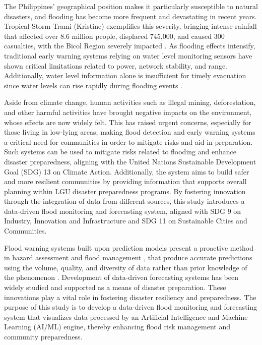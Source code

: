 \documentclass{research}
\begin{document}
The Philippines' geographical position makes it particularly susceptible to natural disasters, and flooding has become more frequent and devastating in recent years. Tropical Storm Trami (Kristine) exemplifies this severity, bringing intense rainfall that affected over 8.6 million people, displaced 745,000, and caused 300 casualties, with the Bicol Region severely impacted \cite{wfp2024kristine}. As flooding effects intensify, traditional early warning systems relying on water level monitoring sensors have shown critical limitations related to power, network stability, and range. Additionally, water level information alone is insufficient for timely evacuation since water levels can rise rapidly during flooding events \cite{piadeh2022critical}.

Aside from climate change, human activities such as illegal mining, deforestation, and other harmful activities have brought negative impacts on the environment, whose effects are now widely felt. This has raised urgent concerns, especially for those living in low-lying areas, making flood detection and early warning systems a critical need for communities in order to mitigate risks and aid in preparation. Such systems can be used to mitigate risks related to flooding and enhance disaster preparedness, aligning with the United Nations Sustainable Development Goal (SDG) 13 on Climate Action. Additionally, the system aims to build safer and more resilient communities by providing information that supports overall planning within LGU disaster preparedness programs. By fostering innovation through the integration of data from different sources, this study introduces a data-driven flood monitoring and forecasting system, aligned with SDG 9 on Industry, Innovation and Infrastructure and SDG 11 on Sustainable Cities and Communities.

Flood warning systems built upon prediction models present a proactive method in hazard assessment and flood management \cite{hammood2021systematic}, that produce accurate predictions using the volume, quality, and diversity of data rather than prior knowledge of the phenomenon \cite{guo2022datadriven}. Development of data-driven forecasting systems has been widely studied and supported as a means of disaster preparation. These innovations play a vital role in fostering disaster resiliency and preparedness. The purpose of this study is to develop a data-driven flood monitoring and forecasting system that visualizes data processed by an Artificial Intelligence and Machine Learning (AI/ML) engine, thereby enhancing flood risk management and community preparedness.
\end{document}
